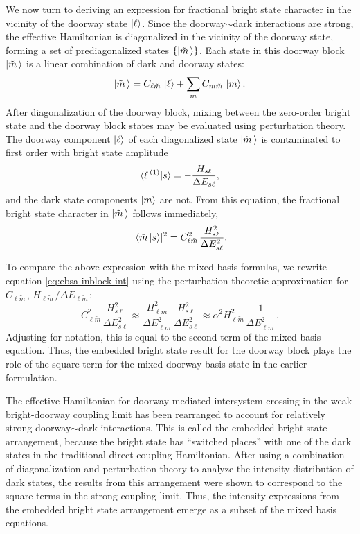 \documentclass[12pt]{mitthesis}
\newcommand{\tm}{\tilde{m}\,}
\begin{document}
We now turn to deriving an expression for fractional bright state
character in the vicinity of the doorway state $\mathinner{|{\ell}\rangle}$.  Since
the doorway$\sim$dark interactions are strong, the effective Hamiltonian is
diagonalized in the vicinity of the doorway state, forming a set of
prediagonalized states $\lbrace \ket{\tm} \rbrace$.  Each state in
this doorway block $\ket{\tm}$ is a linear combination of dark and
doorway states:
\begin{equation}
  \label{eq:ebsa-block}
  \ket{\tm} = C_{\ell \tm} \ket{\ell} + \sum_m C_{m \tm} \ket{m}.
\end{equation}
After diagonalization of the doorway block, mixing between the
zero-order bright state and the doorway block states may be evaluated
using perturbation theory. The doorway component $\mathinner{|{\ell}\rangle}$ of each
diagonalized state $\ket{\tm}$ is contaminated to first order with
bright state amplitude
\begin{equation}
  \label{eq:ebsa-inblock-overlap}
  \mathinner{\langle{\ell\,^{(1)}|s}\rangle} = - \frac{H_{s\ell}}{\Delta E_{s\ell}},
\end{equation}
and the dark state components $\mathinner{|{m}\rangle}$ are not. From this equation,
the fractional bright state character in $\ket{\tm}$ follows
immediately,
\begin{equation}
  \label{eq:ebsa-inblock-int}
  \lvert \braket{\tm|s} \rvert^2 =
  C_{\ell \tm}^2 \frac{H_{s\ell}^2}{\Delta E_{s\ell}^2}.
\end{equation}

To compare the above expression with the mixed basis formulas,
we rewrite equation \ref{eq:ebsa-inblock-int} using the
perturbation-theoretic approximation for $C_{\ell\tm}$, $H_{\ell\tm} /
\Delta E_{\ell\tm}$:
\begin{equation}
  \label{eq:ebsa-inblock-int-approx}
  C_{\ell \tm}^2 \frac{H_{s\ell}^2}{\Delta E_{s\ell}^2} \approx
  \frac{H_{\ell \tm}^2}{\Delta E_{\ell \tm}^2} 
  \frac{ H_{s\ell}^2}{ \Delta E_{s\ell}^2} \approx
  \alpha^2 H_{\ell \tm}^2 \frac{1}{\Delta E_{\ell \tm}^2}.
\end{equation}
Adjusting for notation, this is equal to the second term of the mixed
basis equation.  Thus, the embedded bright state result for the doorway
block plays the role of the square term for the mixed doorway basis
state in the earlier formulation.

The effective Hamiltonian for doorway mediated intersystem crossing in
the weak bright-doorway coupling limit has been rearranged to account
for relatively strong doorway$\sim$dark interactions. This is called the
embedded bright state arrangement, because the bright state has
``switched places'' with one of the dark states in the traditional
direct-coupling Hamiltonian. After using a combination of
diagonalization and perturbation theory to analyze the intensity
distribution of dark states, the results from this arrangement were
shown to correspond to the square terms in the strong coupling
limit. Thus, the intensity expressions from the embedded bright state
arrangement emerge as a subset of the mixed basis equations.
\end{document}
